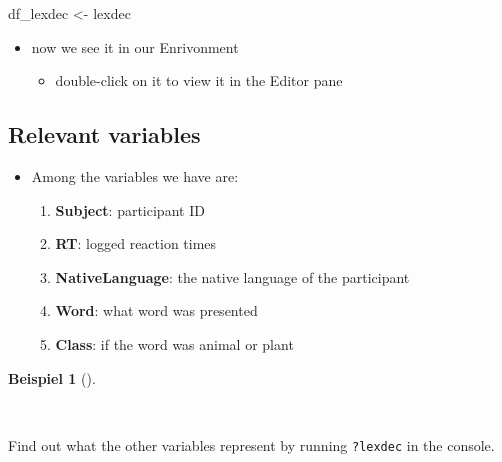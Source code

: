 \documentclass[
  letterpaper,
  DIV=11]{scrartcl}
\newenvironment{Shaded}{\begin{snugshade}}{\end{snugshade}}
\newcommand{\NormalTok}[1]{\textcolor[rgb]{0.00,0.23,0.31}{#1}}
\newcommand{\OtherTok}[1]{\textcolor[rgb]{0.00,0.23,0.31}{#1}}
\providecommand{\tightlist}{%
  \setlength{\itemsep}{0pt}\setlength{\parskip}{0pt}}\usepackage{longtable,booktabs,array}
\theoremstyle{definition}
\newtheorem{example}{Beispiel}[section]
\theoremstyle{remark}
\begin{document}
\begin{Shaded}
\begin{Highlighting}[]
\NormalTok{df\_lexdec }\OtherTok{\textless{}{-}}\NormalTok{ lexdec}
\end{Highlighting}
\end{Shaded}

\begin{itemize}
\tightlist
\item
  now we see it in our Enrivonment

  \begin{itemize}
  \tightlist
  \item
    double-click on it to view it in the Editor pane
  \end{itemize}
\end{itemize}

\hypertarget{relevant-variables}{%
\subsection{Relevant variables}\label{relevant-variables}}

\begin{itemize}
\tightlist
\item
  Among the variables we have are:

  \begin{enumerate}
  \def\labelenumi{\arabic{enumi}.}
  \tightlist
  \item
    \textbf{Subject}: participant ID
  \item
    \textbf{RT}: logged reaction times
  \item
    \textbf{NativeLanguage}: the native language of the participant
  \item
    \textbf{Word}: what word was presented
  \item
    \textbf{Class}: if the word was animal or plant
  \end{enumerate}
\end{itemize}

\begin{tcolorbox}[enhanced jigsaw, colbacktitle=quarto-callout-tip-color!10!white, rightrule=.15mm, toptitle=1mm, bottomtitle=1mm, breakable, leftrule=.75mm, toprule=.15mm, left=2mm, coltitle=black, opacitybacktitle=0.6, title=\textcolor{quarto-callout-tip-color}{\faLightbulb}\hspace{0.5em}{Aufgabe~\ref{exm-help}: \texttt{?lexdec}}, colback=white, titlerule=0mm, arc=.35mm, bottomrule=.15mm, opacityback=0, colframe=quarto-callout-tip-color-frame]

\begin{example}[]\protect\hypertarget{exm-help}{}\label{exm-help}

~

Find out what the other variables represent by running \texttt{?lexdec}
in the console.

\end{example}

\end{tcolorbox}
\end{document}
